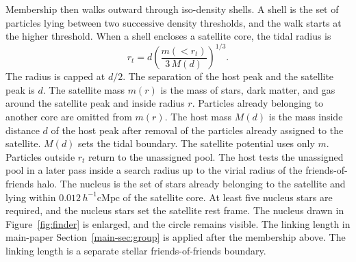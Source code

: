 \documentclass[usenatbib]{mnras}
\begin{document}
Membership then walks outward through iso-density shells.
A shell is the set of particles lying between two successive density
thresholds, and the walk starts at the higher threshold.
When a shell encloses a satellite core, the tidal radius is
\begin{equation}
r_{t}
=
d\left(\frac{m(<r_{t})}{3\,M(d)}\right)^{1/3}.
\label{eq:rt}
\end{equation}
The radius is capped at $d/2$.
The separation of the host peak and the satellite peak is $d$.
The satellite mass $m(r)$ is the mass of stars, dark matter, and gas
around the satellite peak and inside radius $r$.
Particles already belonging to another core are omitted from $m(r)$.
The host mass $M(d)$ is the mass inside distance $d$ of the host peak
after removal of the particles already assigned to the satellite.
$M(d)$ sets the tidal boundary.
The satellite potential uses only $m$.
Particles outside $r_{t}$ return to the unassigned pool.
The host tests the unassigned pool in a later pass inside a search radius
up to the virial radius of the friends-of-friends halo.
The nucleus is the set of stars already belonging to the satellite
and lying within $0.012\,h^{-1}\mathrm{cMpc}$ of the satellite core.
At least five nucleus stars are required, and the nucleus stars set the
satellite rest frame.
The nucleus drawn in Figure~\ref{fig:finder} is enlarged, and the
circle remains visible.
The linking length in main-paper Section~\ref{main-sec:group} is applied after the
membership above.
The linking length is a separate stellar friends-of-friends boundary.
\end{document}
